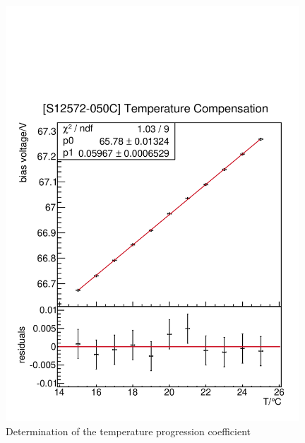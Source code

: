 \begin{figure}[h]
\begin{minipage}[b]{0.49\textwidth}
		\includegraphics[width = 0.98\textwidth]{Figures/radermacher/TempReg_S12572.pdf}
	\end{minipage}
	\caption{Determination of the temperature progression coefficient}
	\label{tempCoeff}
\end{figure}

